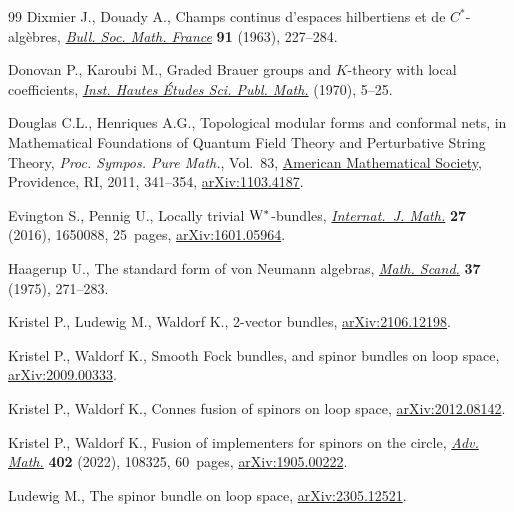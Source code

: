 \documentclass[10pt,a4paper]{amsart}
\numberwithin{equation}{section}
\begin{document}
\begin{thebibliography}{99}
Dixmier J., Douady A., Champs continus d'espaces hilbertiens et de
 {$C^*$}-alg\`ebres, \href{https://doi.org/10.24033/bsmf.1596}{\textit{Bull. Soc. Math. France}} \textbf{91} (1963),
 227--284.

Donovan P., Karoubi M., Graded {B}rauer groups and {$K$}-theory with local
 coefficients,  \href{https://doi.org/10.24033/bsmf.1596}{\textit{Inst. Hautes \'Etudes Sci. Publ. Math.}} (1970), 5--25.

Douglas C.L., Henriques A.G., Topological modular forms and conformal nets, in
 Mathematical {F}oundations of {Q}uantum {F}ield {T}heory and {P}erturbative
 {S}tring {T}heory, \textit{Proc. Sympos. Pure Math.}, Vol.~83,  \href{https://doi.org/10.1090/pspum/083/2742433}{American
 Mathematical Society}, Providence, RI, 2011, 341--354, \href{https://arxiv.org/abs/1103.4187}{arXiv:1103.4187}.

Evington S., Pennig U., Locally trivial {${\rm W}^*$}-bundles,
 \href{https://doi.org/10.1142/S0129167X16500889}{\textit{Internat.~J. Math.}} \textbf{27} (2016), 1650088, 25~pages,
 \href{https://arxiv.org/abs/1601.05964}{arXiv:1601.05964}.

Haagerup U., The standard form of von {N}eumann algebras,  \href{https://doi.org/10.7146/math.scand.a-11606}{\textit{Math. Scand.}}
 \textbf{37} (1975), 271--283.

Kristel P., Ludewig M., Waldorf K., 2-vector bundles, \href{https://arxiv.org/abs/2106.12198}{arXiv:2106.12198}.

Kristel P., Waldorf K., Smooth {F}ock bundles, and spinor bundles on loop
 space, \href{https://arxiv.org/abs/2009.00333}{arXiv:2009.00333}.

Kristel P., Waldorf K., Connes fusion of spinors on loop space,
 \href{https://arxiv.org/abs/2012.08142}{arXiv:2012.08142}.

Kristel P., Waldorf K., Fusion of implementers for spinors on the circle,
 \href{https://doi.org/10.1016/j.aim.2022.108325}{\textit{Adv. Math.}} \textbf{402} (2022), 108325, 60~pages,
 \href{https://arxiv.org/abs/1905.00222}{arXiv:1905.00222}.

Ludewig M., The spinor bundle on loop space, \href{https://arxiv.org/abs/2305.12521}{arXiv:2305.12521}.


\end{thebibliography}
\end{document}
